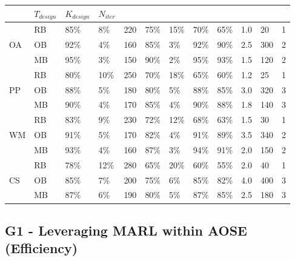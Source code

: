 \documentclass[pdflatex,sn-mathphys-num]{sn-jnl}%
\theoremstyle{thmstyleone}%
\theoremstyle{thmstyletwo}%
\theoremstyle{thmstylethree}%
\begin{document}
\begin{table}[h!]
\begin{tabular}{p{0.5cm}|p{1cm}|p{0.4cm}p{0.3cm}p{0.3cm}p{0.85cm}|p{0.4cm}p{0.4cm}p{0.55cm}|p{0.8cm}p{0.8cm}p{0.8cm}}
                      & $T_{design}$    & $K_{design}$ & $N_{iter}$                                                            \\
        \hline
        \multirow{3}{*}{OA}
                      & RB              & 85\%         & 8\%        & 220          & 75\% & 15\% & 70\% & 65\% & 1.0 & 20  & 1 \\
                      & OB              & 92\%         & 4\%        & 160          & 85\% & 3\%  & 92\% & 90\% & 2.5 & 300 & 2 \\
                      & MB              & 95\%         & 3\%        & 150          & 90\% & 2\%  & 95\% & 93\% & 1.5 & 120 & 2 \\
        \hline
        \multirow{3}{*}{PP}
                      & RB              & 80\%         & 10\%       & 250          & 70\% & 18\% & 65\% & 60\% & 1.2 & 25  & 1 \\
                      & OB              & 88\%         & 5\%        & 180          & 80\% & 5\%  & 88\% & 85\% & 3.0 & 320 & 3 \\
                      & MB              & 90\%         & 4\%        & 170          & 85\% & 4\%  & 90\% & 88\% & 1.8 & 140 & 3 \\
        \hline
        \multirow{3}{*}{WM}
                      & RB              & 83\%         & 9\%        & 230          & 72\% & 12\% & 68\% & 63\% & 1.5 & 30  & 1 \\
                      & OB              & 91\%         & 5\%        & 170          & 82\% & 4\%  & 91\% & 89\% & 3.5 & 340 & 2 \\
                      & MB              & 93\%         & 4\%        & 160          & 87\% & 3\%  & 94\% & 91\% & 2.0 & 150 & 2 \\
        \hline
        \multirow{3}{*}{CS}
                      & RB              & 78\%         & 12\%       & 280          & 65\% & 20\% & 60\% & 55\% & 2.0 & 40  & 1 \\
                      & OB              & 85\%         & 7\%        & 200          & 75\% & 6\%  & 85\% & 82\% & 4.0 & 400 & 3 \\
                      & MB              & 87\%         & 6\%        & 190          & 80\% & 5\%  & 87\% & 85\% & 2.5 & 180 & 3 \\
        \hline
    \end{tabular}
    \label{tab:g1_g2_g3_g4}
\end{table}

\subsection{G1 - Leveraging MARL within AOSE (Efficiency)}
\end{document}
